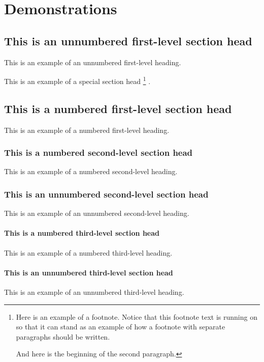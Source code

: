 \chapter{Demonstrations}

\section*{This is an unnumbered first-level section head}
This is an example of an unnumbered first-level heading.

This is an example of a special section head%
\footnote{Here is an example of a footnote. Notice that this footnote
text is running on so that it can stand as an example of how a footnote
with separate paragraphs should be written.
\par
And here is the beginning of the second paragraph.}%
.

\section{This is a numbered first-level section head}
This is an example of a numbered first-level heading.

\subsection{This is a numbered second-level section head}
This is an example of a numbered second-level heading.

\subsection*{This is an unnumbered second-level section head}
This is an example of an unnumbered second-level heading.

\subsubsection{This is a numbered third-level section head}
This is an example of a numbered third-level heading.

\subsubsection*{This is an unnumbered third-level section head}
This is an example of an unnumbered third-level heading.

